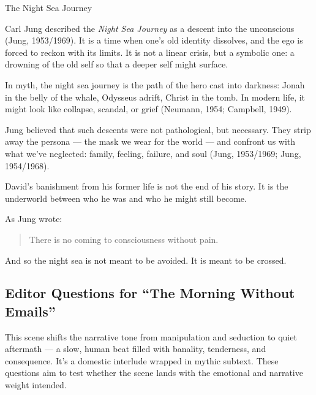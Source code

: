 \begin{PsychologicalSidebar}{The Night Sea Journey}

  Carl Jung described the \textit{Night Sea Journey} as a descent into the unconscious 
  (Jung, 1953/1969). It is a time when one’s old identity dissolves, and the ego is forced 
  to reckon with its limits. It is not a linear crisis, but a symbolic one: a drowning of the 
  old self so that a deeper self might surface.

  \medskip
  
  In myth, the night sea journey is the path of the hero cast into darkness: Jonah in the belly 
  of the whale, Odysseus adrift, Christ in the tomb. In modern life, it might look like collapse, 
  scandal, or grief (Neumann, 1954; Campbell, 1949). 

  \medskip
  
  Jung believed that such descents were not pathological, but necessary. They strip away the 
  persona --- the mask we wear for the world --- and confront us with what we’ve neglected: 
  family, feeling, failure, and soul (Jung, 1953/1969; Jung, 1954/1968).

  \medskip
  
  David’s banishment from his former life is not the end of his story.  
  It is the underworld between who he was and who he might still become.

  \medskip
  
  As Jung wrote: 

  \begin{quote}
      There is no coming to consciousness without pain.
  \end{quote}
  
  And so the night sea is not meant to be avoided.  
  It is meant to be crossed.

\end{PsychologicalSidebar}



\subsection*{Editor Questions for ``The Morning Without Emails''}

This scene shifts the narrative tone from manipulation and seduction to quiet aftermath — a slow, human beat filled with banality, tenderness, and consequence. It’s a domestic interlude wrapped in mythic subtext. These questions aim to test whether the scene lands with the emotional and narrative weight intended.


